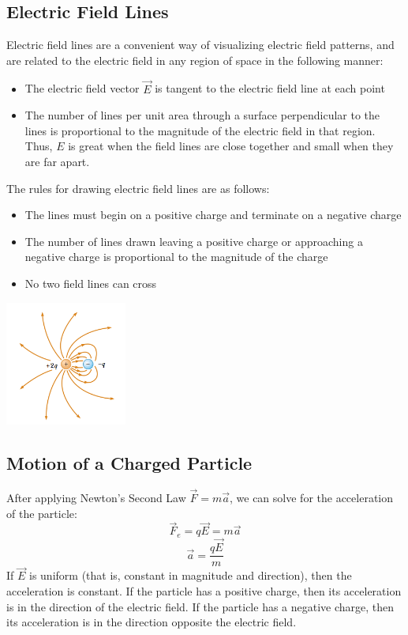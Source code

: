 \documentclass{article}
\begin{document}
\subsection{Electric Field Lines}
Electric field lines are a convenient way of visualizing electric field patterns, and are related to the electric field in any region of space in the following manner:\\
\begin{itemize}
\item The electric field vector $\vec{E}$ is tangent to the electric field line at each point
\item The number of lines per unit area through a surface perpendicular to the lines is proportional to the magnitude of the electric field in that region. Thus, $E$ is great when the field lines are close together and small when they are far apart.\\
\end{itemize}
\begin{multicols}{2}
  The rules for drawing electric field lines are as follows:\\
  \begin{itemize}
  \item The lines must begin on a positive charge and terminate on a negative charge
  \item The number of lines drawn leaving a positive charge or approaching a negative charge is proportional to the magnitude of the charge
  \item No two field lines can cross
  \end{itemize}
  \vfill
  \columnbreak
  \centerline{\includegraphics[width=4cm]{fieldLines.png}}
\end{multicols}

\subsection{Motion of a Charged Particle}
After applying Newton's Second Law $\vec{F}=m\vec{a}$, we can solve for the acceleration of the particle:
\[
\vec{F}_e=q\vec{E}=m\vec{a}
\]
\[
\vec{a}=\frac{q\vec{E}}{m}
\]
If $\vec{E}$ is uniform (that is, constant in magnitude and direction), then the acceleration is constant. If the particle has a positive charge, then its acceleration is in the direction of the electric field. If the particle has a negative charge, then its acceleration is in the direction opposite the electric field.
\end{document}

